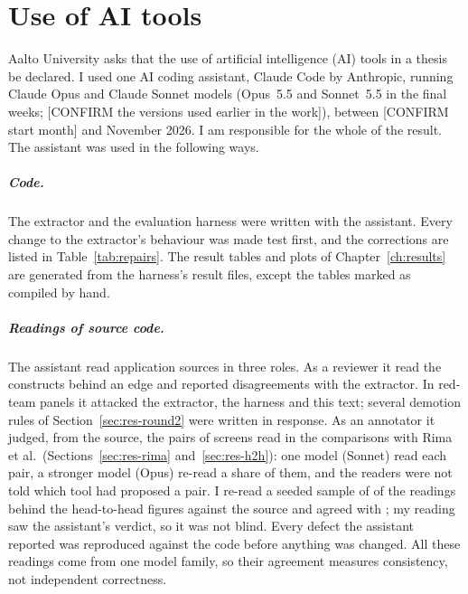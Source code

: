 
\chapter*{Use of AI tools}

Aalto University asks that the use of artificial intelligence (AI) tools in a thesis be declared. I used
one AI coding assistant, Claude Code by Anthropic, running Claude Opus and Claude Sonnet models
(Opus~5.5 and Sonnet~5.5 in the final weeks; [CONFIRM the versions used earlier in the work]), between
[CONFIRM start month] and November 2026. I am responsible for the whole of the result. The assistant was
used in the following ways.

\paragraph{Code.} The extractor and the evaluation harness were written with the assistant. Every change
to the extractor's behaviour was made test first, and the corrections are listed in
Table~\ref{tab:repairs}. The result tables and plots of Chapter~\ref{ch:results} are generated from the
harness's result files, except the tables marked as compiled by hand.

\paragraph{Readings of source code.} The assistant read application sources in three roles. As a
reviewer it read the constructs behind an edge and reported disagreements with the extractor. In
red-team panels it attacked the extractor, the harness and this text; several demotion rules of
Section~\ref{sec:res-round2} were written in response. As an annotator it judged, from the source, the
pairs of screens read in the comparisons with Rima et al.\ (Sections~\ref{sec:res-rima}
and~\ref{sec:res-h2h}): one model (Sonnet) read each pair, a stronger model (Opus) re-read a share of
them, and the readers were not told which tool had proposed a pair. I re-read a seeded sample of
\HHAuthorSample{} of the readings behind the head-to-head figures against the source and agreed with
\HHAuthorAgree{}; my reading saw the assistant's verdict, so it was not blind. Every defect the
assistant reported was reproduced against the code before anything was changed. All these readings
come from one model family, so their agreement measures consistency, not independent correctness.

